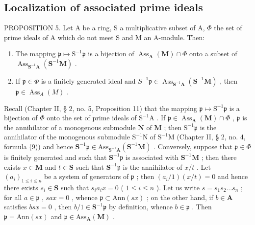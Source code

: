 \subsection{Localization of associated prime ideals}

PROPOSITION 5. Let A be a ring, S a multiplicative subset of A, \(\Phi\) the set of prime ideals of A which do not meet S and M an A-module. Then:

\begin{enumerate}
\def\labelenumi{(\roman{enumi})}
\item
  The mapping \(\mathfrak{p} \mapsto \mathrm{S}^{-1}\mathfrak{p}\) is a bijection of \(\operatorname{Ass}_{\mathbf{A}}(\mathbf{M}) \cap \Phi\) onto a subset of \(\operatorname{Ass}_{\mathbf{S}^{-1}\mathbf{A}}(\mathbf{S}^{-1}\mathbf{M})\) .
\item
  If \(\mathfrak{p} \in \Phi\) is a finitely generated ideal and \(S^{-1}\mathfrak{p} \in \operatorname{Ass}_{\mathbf{S}^{-1}\mathbf{A}}(\mathbf{S}^{-1}\mathbf{M})\) , then \(\mathfrak{p} \in \operatorname{Ass}_A(M)\) .
\end{enumerate}

Recall (Chapter II, § 2, no. 5, Proposition 11) that the mapping \(\mathfrak{p} \mapsto \mathrm{S}^{-1}\mathfrak{p}\) is a bijection of \(\Phi\) onto the set of prime ideals of \(\mathrm{S}^{-1}\mathrm{A}\) . If \(\mathfrak{p} \in \operatorname{Ass}_{\mathbf{A}}(\mathbf{M}) \cap \Phi\) , \(\mathfrak{p}\) is the annihilator of a monogenous submodule \(\mathbf{N}\) of \(\mathbf{M}\) ; then \(\mathrm{S}^{-1}\mathfrak{p}\) is the annihilator of the monogenous submodule \(\mathrm{S}^{-1}\mathrm{N}\) of \(\mathrm{S}^{-1}\mathrm{M}\) (Chapter II, § 2, no. 4, formula (9)) and hence \(\mathbf{S}^{-1}\mathfrak{p}\in\mathrm{Ass}_{\mathbf{S}^{-1}\mathbf{A}}(\mathbf{S}^{-1}\mathbf{M})\) . Conversely, suppose that \(\mathfrak{p}\in\Phi\) is finitely generated and such that \(\mathbf{S}^{-1}\mathfrak{p}\) is associated with \(\mathbf{S}^{-1}\mathbf{M}\) ; then there exists \(x\in\mathbf{M}\) and \(t\in\mathbf{S}\) such that \(\mathbf{S}^{-1}\mathfrak{p}\) is the annihilator of \(x/t\) . Let \((a_{i})_{1\leqslant i\leqslant n}\) be a system of generators of \(\mathfrak{p}\) ; then \((a_{i}/1)(x/t)=0\) and hence there exists \(s_{i}\in\mathbf{S}\) such that \(s_{i}a_{i}x=0\) ( \(1\leqslant i\leqslant n\) ). Let us write \(s=s_{1}s_{2}\ldots s_{n}\) ; for all \(a\in\mathfrak{p}\) , \(sax=0\) , whence \(\mathfrak{p}\subset\mathrm{Ann}(sx)\) ; on the other hand, if \(b\in\mathbf{A}\) satisfies \(bsx=0\) , then \(b/1\in\mathbf{S}^{-1}\mathfrak{p}\) by definition, whence \(b\in\mathfrak{p}\) . Then \(\mathfrak{p}=\mathrm{Ann}(sx)\) and \(\mathfrak{p}\in\mathrm{Ass}_{\mathbf{A}}(\mathbf{M})\) .

